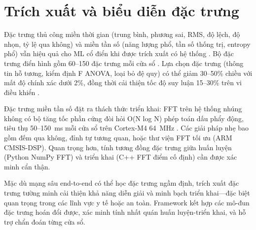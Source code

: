 \section{Trích xuất và biểu diễn đặc trưng}
Đặc trưng thủ công miền thời gian (trung bình, phương sai, RMS, độ lệch, độ nhọn, tỷ lệ qua không) và miền tần số (năng lượng phổ, tần số thống trị, entropy phổ) vẫn hiệu quả cho ML cổ điển khi được trích xuất có hệ thống \cite{oppenheim1999discrete}. Bộ đặc trưng điển hình gồm 60--150 đặc trưng mỗi cửa sổ \cite{wang2024har_comparative}. Lựa chọn đặc trưng (thông tin hỗ tương, kiểm định F ANOVA, loại bỏ đệ quy) có thể giảm 30--50\% chiều với mất độ chính xác dưới 2\%, đồng thời cải thiện tốc độ suy luận 15--30\% trên vi điều khiển \cite{banos2014wisdm}.

Đặc trưng miền tần số đặt ra thách thức triển khai: FFT trên hệ thống nhúng không có bộ tăng tốc phần cứng đòi hỏi O(N log N) phép toán dấu phẩy động, tiêu thụ 50--150~ms mỗi cửa sổ trên Cortex-M4 64~MHz \cite{banbury2021mlperf}. Các giải pháp nhẹ bao gồm đếm qua không, đỉnh tự tương quan, hoặc thư viện FFT tối ưu (ARM CMSIS-DSP). Quan trọng hơn, tính tương đồng đặc trưng giữa huấn luyện (Python NumPy FFT) và triển khai (C++ FFT điểm cố định) cần được xác minh cẩn thận.

Mặc dù mạng sâu end-to-end có thể học đặc trưng ngầm định, trích xuất đặc trưng tường minh cải thiện khả năng diễn giải và minh bạch triển khai---đặc biệt quan trọng trong các lĩnh vực y tế hoặc an toàn. Framework kết hợp các mô-đun đặc trưng hoán đổi được, xác minh tính nhất quán huấn luyện-triển khai, và hỗ trợ chẩn đoán từng cửa sổ.

